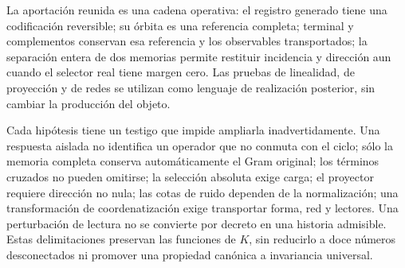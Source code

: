 La aportación reunida es una cadena operativa: el registro generado tiene
una codificación reversible; su órbita es una referencia completa;
terminal y complementos conservan esa referencia y los observables
transportados; la separación entera de dos memorias permite restituir
incidencia y dirección aun cuando el selector real tiene margen cero.
Las pruebas de linealidad, de proyección y de redes se utilizan como
lenguaje de realización posterior, sin cambiar la producción del objeto.

Cada hipótesis tiene un testigo que impide ampliarla inadvertidamente.
Una respuesta aislada no identifica un operador que no conmuta con el
ciclo; sólo la memoria completa conserva automáticamente el Gram original;
los términos cruzados no pueden omitirse; la selección absoluta exige
carga; el proyector requiere dirección no nula; las cotas de ruido
dependen de la normalización; una transformación de coordenatización exige transportar
forma, red y lectores. Una perturbación de lectura no se convierte por
decreto en una historia admisible. Estas delimitaciones preservan las
funciones de \(K\), sin reducirlo a doce números desconectados ni
promover una propiedad canónica a invariancia universal.
